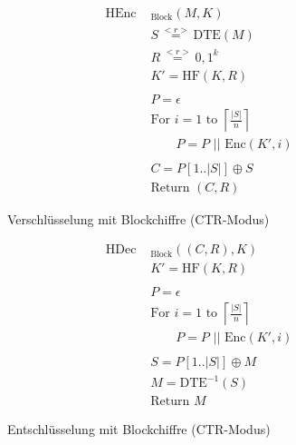 \begin{figure}[h!]
	\begin{align*}
		\text{HEnc }&_{\text{Block}}(M, K)\\
		&S \overset{<r>}{=} \text{DTE}(M)\\ 	%
		&R \overset{<r>}{=} {0,1}^k\\	%
		&K' = \text{HF}(K,R)\\ 		%
		\\
		&P = \epsilon \\
		&\text{For } i = 1 \text{ to } \left\lceil \frac{|S|}{n} \right\rceil \\
		&\qquad P = P \text{ || Enc}(K',i)\\	%
		\\
		&C = P[1 .. |S|] \oplus S\\	%
		&\text{Return } (C,R)
	\end{align*}
	\caption{Verschlüsselung mit Blockchiffre (CTR-Modus)}
	\label{fig:BlockEnc}
\end{figure}

\begin{figure}[h!]
	\begin{align*}
		\text{HDec }&_{\text{Block}}((C,R), K)\\
		&K' = \text{HF}(K,R)\\ 		%
		\\
		&P = \epsilon \\
		&\text{For } i = 1 \text{ to } \left\lceil \frac{|S|}{n} \right\rceil \\
		&\qquad P = P \text{ || Enc}(K',i)\\	%
		\\
		&S = P[1 .. |S|] \oplus M\\	%
		&M = \text{DTE}^{-1}(S)\\ 	%
		&\text{Return } M
	\end{align*}
	\caption{Entschlüsselung mit Blockchiffre (CTR-Modus)}
	\label{fig:BlockDec}
\end{figure}

\newpage